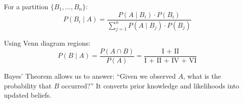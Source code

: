 \begin{eg}
For a partition $\{B_1, \ldots, B_n\}$:
\[
P(B_i \mid A) = \frac{P(A \mid B_i) \cdot P(B_i)}{\sum_{j=1}^{n} P(A \mid B_j) \cdot P(B_j)}
\]
\end{eg}

\begin{eg}
Using Venn diagram regions:
\[
P(B \mid A) = \frac{P(A \cap B)}{P(A)} = \frac{\text{I + II}}{\text{I + II + IV + VI}}
\]
\end{eg}

\begin{intuition}
Bayes’ Theorem allows us to answer: “Given we observed $A$, what is the probability that $B$ occurred?” It converts prior knowledge and likelihoods into updated beliefs.
\end{intuition}
